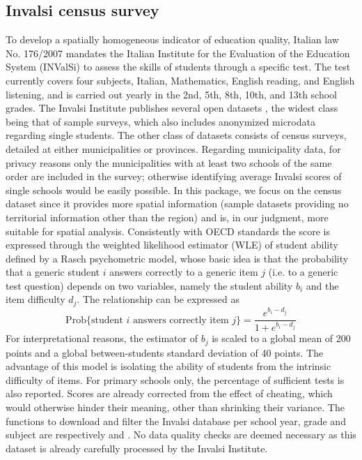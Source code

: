 \documentclass{book}
\begin{document}
\subsection{Invalsi census survey} \label{par:Invalsi}
To develop a spatially homogeneous indicator of education quality, Italian law No. 176/2007 \citep{InvalsiLaw} mandates the Italian Institute for the Evaluation of the Education System (INValSi) to assess the skills of students through a specific test. The test currently covers four subjects, Italian, Mathematics, English reading, and English listening, and is carried out yearly in the 2nd, 5th, 8th, 10th, and 13th school grades. 
The Invalsi Institute publishes several open datasets \citep{Invalsi_IS}, the widest class being that of sample surveys, which also includes anonymized microdata regarding single students. The other class of datasets consists of census surveys, detailed at either municipalities or provinces. Regarding municipality data, for privacy reasons only the municipalities with at least two schools of the same order are included in the survey; otherwise identifying average Invalsi scores of single schools would be easily possible. In this package, we focus on the census dataset since it provides more spatial information (sample datasets providing no territorial information other than the region) and is, in our judgment, more suitable for spatial analysis. 
Consistently with OECD standards \citep{PISA} the score is expressed through the weighted likelihood estimator (WLE) of student ability defined by a Rasch psychometric model, whose basic idea is that the probability that a generic student $i$ answers correctly to a generic item $j$ (i.e. to a generic test question) depends on two variables, namely the student ability $b_i$ and the item difficulty $d_j$. The relationship can be expressed as
$$
\mathrm{Prob} \lbrace \text{student } i \text{ answers correctly item } j \rbrace= \frac{e^{b_i - d_j}}{1 + e^{b_i - d_j}}
$$
For interpretational reasons, the estimator of $b_j$ is scaled to a global mean of 200 points and a global between-students standard deviation of 40 points. The advantage of this model is isolating the ability of students from the intrinsic difficulty of items. For primary schools only, the percentage of sufficient tests is also reported. Scores are already corrected from the effect of cheating, which would otherwise hinder their meaning, other than shrinking their variance. The functions to download and filter the Invalsi database per school year, grade and subject are respectively \texttt{} and \texttt{}. No data quality checks are deemed necessary as this dataset is already carefully processed by the Invalsi Institute.
\end{document}
